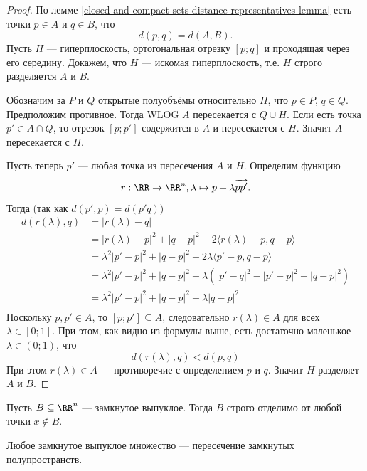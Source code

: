\documentclass[12pt,a4paper]{article}
\begin{document}
    \begin{proof}
        По лемме \ref{closed-and-compact-sets-distance-representatives-lemma} есть точки $p \in A$ и $q \in B$, что
        \[d(p, q) = d(A, B).\]
        Пусть $H$ --- гиперплоскость, ортогональная отрезку $[p;q]$ и проходящая через его середину. Докажем, что $H$ --- искомая гиперплоскость, т.е. $H$ строго разделяется $A$ и $B$.

        Обозначим за $P$ и $Q$ открытые полуобъёмы относительно $H$, что $p \in P$, $q \in Q$. Предположим противное. Тогда WLOG $A$ пересекается с $Q \cup H$. Если есть точка $p' \in A \cap Q$, то отрезок $[p;p']$ содержится в $A$ и пересекается с $H$. Значит $A$ пересекается с $H$.

        Пусть теперь $p'$ --- любая точка из пересечения $A$ и $H$. Определим функцию
        \[r: \RR \to \RR^n, \lambda \mapsto p + \lambda \overrightarrow{pp'}.\]
        Тогда (так как $d(p', p) = d(p' q)$)
        \begin{align*}
            d(r(\lambda), q)
            &= |r(\lambda) - q|\\
            &= |r(\lambda) - p|^2 + |q - p|^2 - 2\langle r(\lambda) - p, q - p \rangle\\
            &= \lambda^2 |p' - p|^2 + |q - p|^2 - 2 \lambda \langle p' - p, q - p \rangle\\
            &= \lambda^2 |p' - p|^2 + |q - p|^2 + \lambda(|p' - q|^2 - |p' - p|^2 - |q - p|^2)\\
            &= \lambda^2 |p' - p|^2 + |q - p|^2 - \lambda|q - p|^2\\
        \end{align*}
        Поскольку $p, p' \in A$, то $[p; p'] \subseteq A$, следовательно $r(\lambda) \in A$ для всех $\lambda \in [0; 1]$. При этом, как видно из формулы выше, есть достаточно маленькое $\lambda \in (0; 1)$, что
        \[d(r(\lambda), q) < d(p, q)\]
        При этом $r(\lambda) \in A$ --- противоречие с определением $p$ и $q$. Значит $H$ разделяет $A$ и $B$.
    \end{proof}

    \begin{corollary}
        Пусть $B \subseteq \RR^n$ --- замкнутое выпуклое. Тогда $B$ строго отделимо от любой точки $x \notin B$.
    \end{corollary}

    \begin{corollary}
        Любое замкнутое выпуклое множество --- пересечение замкнутых полупространств.
    \end{corollary}
\end{document}
